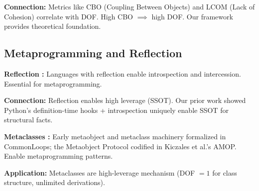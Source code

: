 \textbf{Connection:} Metrics like CBO (Coupling Between Objects) and LCOM (Lack of Cohesion) correlate with DOF. High CBO $\implies$ high DOF. Our framework provides theoretical foundation.

\subsection{Metaprogramming and Reflection}

\textbf{Reflection \cite{maes1987concepts}:} Languages with reflection enable introspection and intercession. Essential for metaprogramming.

\textbf{Connection:} Reflection enables high leverage (SSOT). Our prior work showed Python's definition-time hooks + introspection uniquely enable SSOT for structural facts.

\textbf{Metaclasses \cite{bobrow1986commonloops, kiczales1991amop}:} Early metaobject and metaclass machinery formalized in CommonLoops; the Metaobject Protocol codified in Kiczales et al.'s AMOP. Enable metaprogramming patterns.

\textbf{Application:} Metaclasses are high-leverage mechanism (DOF $= 1$ for class structure, unlimited derivations).

